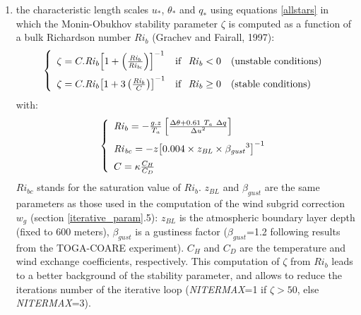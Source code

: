 \begin{enumerate}
	\item the characteristic length scales $u_*$, ${\theta}_*$ and $q_*$ using equations \ref{allstars} in which the Monin-Obukhov
stability parameter $\zeta$ is computed as a function of a bulk Richardson number $\mathit{Ri}_b$ (Grachev and Fairall, 1997\nocite{grachev1997}):
\begin{equation}
\left\{
\begin{array}{lll}
\vspace*{0.2 cm}
	\zeta=C.\mathit{Ri}_b{\left[1+\left(\frac{\mathit{Ri}_b}{\mathit{Ri}_{\mathit{bc}}}\right)\right]}^{-1} & \mathrm{if}~~\mathit{Ri}_b<0 & \mathrm{(unstable}~\mathrm{conditions)}\\
	\zeta=C.\mathit{Ri}_b{\left[1+3\left(\frac{\mathit{Ri}_b}{C}\right)\right]}^{-1} & \mathrm{if}~~\mathit{Ri}_b\geq0 & \mathrm{(stable}~\mathrm{conditions)}\\
\end{array}
\right.
\end{equation}
with:
\begin{equation}
\left\{
\begin{array}{l}
\vspace*{0.2 cm}
	\mathit{Ri}_b=-\frac{g.z}{T_a}\left[\frac{\Delta \theta + 0.61~T_a~\Delta q}{{\Delta u}^2}\right]\\
\vspace*{0.2 cm}
	\mathit{Ri}_{\mathit{bc}}=-z{\left[0.004\times z_{\mathit{BL}}\times{{\beta}_{\mathit{gust}}}^3\right]}^{-1}\\
	C=\kappa\frac{C_H}{C_D}
\end{array}
\right.
\end{equation}
$\mathit{Ri}_{\mathit{bc}}$ stands for the saturation value of $\mathit{Ri}_b$. 
$z_{\mathit{BL}}$ and ${\beta}_{\mathit{gust}}$ are the same parameters as those used in the computation of the wind subgrid correction 
$w_g$ (section \ref{iterative_param}.5): $z_{\mathit{BL}}$ is the atmospheric boundary layer depth (fixed to 600 meters),
${\beta}_{\mathit{gust}}$ is a gustiness factor (${\beta}_{\mathit{gust}}$=1.2 following results from the TOGA-COARE experiment).
$C_H$ and $C_D$ are the temperature and wind exchange coefficients, respectively.
This computation of $\zeta$ from $\mathit{Ri}_b$ leads to a better background of the stability parameter, and allows to reduce the iterations number 
of the iterative loop (\textit{NITERMAX}=1 if ${\zeta}>50$, else \textit{NITERMAX}=3).
\end{enumerate}

\vspace*{0.1 cm}


